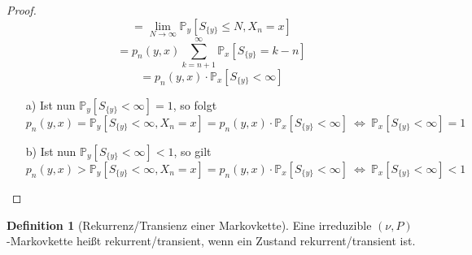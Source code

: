 \documentclass[a4paper,12pt]{scrartcl}
\theoremstyle{definition}
\newtheorem{defi}{Definition}[section]
\begin{document}
\begin{proof}
\begin{equation*}
= \lim_{N \to \infty} \mathbb{P}_{y}[S_{\lbrace y \rbrace} \leq N, X_{n} = x]
\end{equation*}
\begin{equation*}
= p_{n}(y,x) \sum_{k=n+1}^{\infty}\mathbb{P}_{x}[S_{\lbrace y \rbrace} = k-n]
\end{equation*}
\begin{equation*}
 = p_{n}(y,x) \cdot \mathbb{P}_{x}[S_{\lbrace y \rbrace} < \infty]
\end{equation*}
\begin{itemize}
\item[a)] Ist nun $\mathbb{P}_{y}[S_{\lbrace y \rbrace} < \infty] = 1$, so folgt
\begin{equation*}
p_{n}(y,x) = \mathbb{P}_{y}[S_{\lbrace y \rbrace} < \infty, X_{n} = x] = p_{n}(y,x) \cdot \mathbb{P}_{x}[S_{\lbrace y \rbrace} < \infty] \: \Leftrightarrow \: \mathbb{P}_{x}[S_{\lbrace y \rbrace} < \infty] = 1 
\end{equation*}
\item[b)] Ist nun $\mathbb{P}_{y}[S_{\lbrace y \rbrace} < \infty] < 1$, so gilt
\begin{equation*}
p_{n}(y,x) > \mathbb{P}_{y}[S_{\lbrace y \rbrace} < \infty, X_{n} = x] = p_{n}(y,x) \cdot \mathbb{P}_{x}[S_{\lbrace y \rbrace} < \infty] \: \Leftrightarrow \: \mathbb{P}_{x}[S_{\lbrace y \rbrace} < \infty] < 1 
\end{equation*}
\end{itemize}
\end{proof}
\begin{defi}[Rekurrenz/Transienz einer Markovkette]
Eine irreduzible $(\nu,P)$-Markovkette heißt rekurrent/transient, wenn ein Zustand rekurrent/transient ist.
\end{defi}
\end{document}
